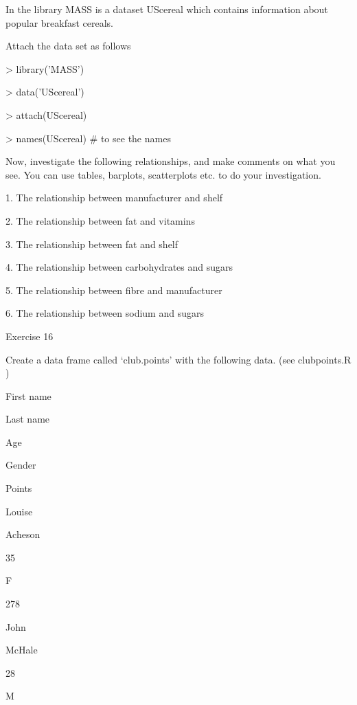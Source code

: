 In the library MASS is a dataset UScereal which contains information about popular breakfast cereals.

 

Attach the data set as follows

> library('MASS')

> data('UScereal')

> attach(UScereal)

> names(UScereal)         # to see the names

 

Now, investigate the following relationships, and make comments on what you see. You can use tables, barplots, scatterplots etc. to do your investigation.

 

1. The relationship between manufacturer and shelf

2. The relationship between fat and vitamins

3. The relationship between fat and shelf

4. The relationship between carbohydrates and sugars

5. The relationship between fibre and manufacturer

6. The relationship between sodium and sugars

 

Exercise 16

 

Create a data frame called ‘club.points’ with the following data. (see clubpoints.R )

 











First name
 

Last name
 

Age
 

Gender
 

Points
 



Louise
 

Acheson
 

35
 

F
 

278
 



John
 

McHale
 

28
 

M
 


